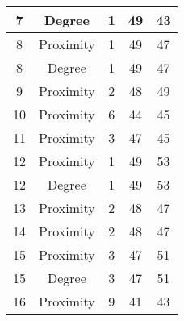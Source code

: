 \documentclass[results.tex]{subfiles}
\begin{document}
\begin{center}
\begin{tabular}{| c || c | c | c | c |}
            \hline
            7                       & Degree                       & 1                      & 49                      & 43                   \\
            \hline
            8                       & Proximity                    & 1                      & 49                      & 47                   \\
            \hline
            8                       & Degree                       & 1                      & 49                      & 47                   \\
            \hline
            9                       & Proximity                    & 2                      & 48                      & 49                   \\
            \hline
            10                      & Proximity                    & 6                      & 44                      & 45                   \\
            \hline
            11                      & Proximity                    & 3                      & 47                      & 45                   \\
            \hline
            12                      & Proximity                    & 1                      & 49                      & 53                   \\
            \hline
            12                      & Degree                       & 1                      & 49                      & 53                   \\
            \hline
            13                      & Proximity                    & 2                      & 48                      & 47                   \\
            \hline
            14                      & Proximity                    & 2                      & 48                      & 47                   \\
            \hline
            15                      & Proximity                    & 3                      & 47                      & 51                   \\
            \hline
            15                      & Degree                       & 3                      & 47                      & 51                   \\
            \hline
            16                      & Proximity                    & 9                      & 41                      & 43                   \\

\end{tabular}
\end{center}
\end{document}
